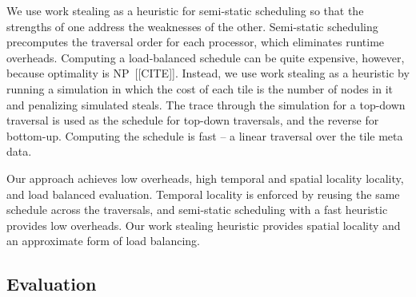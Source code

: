 We use work stealing as a heuristic for semi-static scheduling so that the strengths of one address the weaknesses of the other. Semi-static scheduling precomputes the traversal order for each processor, which eliminates runtime overheads. Computing a load-balanced schedule can be quite expensive, however, because optimality is NP~[[CITE]]. Instead, we use work stealing as a heuristic by running a simulation in which the cost of each tile is the number of nodes in it and penalizing simulated steals. The trace through the simulation for a top-down traversal is used as the schedule for top-down traversals, and the reverse for bottom-up. Computing the schedule is fast -- a linear traversal over the tile meta data. 

Our approach achieves low overheads, high temporal and spatial locality locality, and load balanced evaluation. Temporal locality is enforced by reusing the same schedule across the traversals, and semi-static scheduling with a fast heuristic provides low overheads. Our work stealing heuristic provides spatial locality and an approximate form of load balancing.


\subsection{Evaluation}

